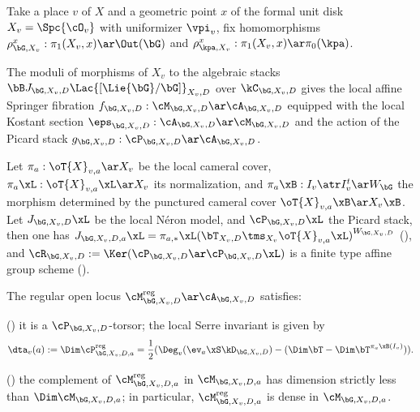 \documentclass[a4paper, twoside]{article}
\begin{document}
\begin{stp}
	Take a place $v$ of $X$ and a geometric point $x$ of the formal unit disk $X_{v}=\Spc{\cO_{v}}$ with uniformizer $\vpi_{v}$, fix homomorphisms $\rho_{\bG,X_{v}}^{x}:\pi_{1}(X_{v},x)\ar\Out(\bG)$ and $\rho_{\kpa,X_{v}}^{x}:\pi_{1}(X_{v},x)\ar\pi_{0}(\kpa)$.

	The moduli of morphisms of $X_{v}$ to the algebraic stacks $\bB J_{\bG,X_{v},D}\Lac {[\Lie{\bG}/\bG]}_{X_{v},D}$ over $\kC_{\bG,X_{v},D}$ gives the local affine Springer fibration $f_{\bG,X_{v},D}:\cM_{\bG,X_{v},D}\ar\cA_{\bG,X_{v},D}$ equipped with the local Kostant section $\eps_{\bG,X_{v},D}:\cA_{\bG,X_{v},D}\ar\cM_{\bG,X_{v},D}$ and the action of the Picard stack $g_{\bG,X_{v},D}:\cP_{\bG,X_{v},D}\ar\cA_{\bG,X_{v},D}$.

	Let $\pi_{a}:\oT{X}_{v,a}\ar X_{v}$ be the local cameral cover, $\pi_{a}\xL:\oT{X}_{v,a}\xL\ar X_{v}$ its normalization, and $\pi_{a}\xB:I_{v}\atr I_{v}^{t}\ar W_{\bG}$ the morphism determined by the punctured cameral cover $\oT{X}_{v,a}\xB\ar X_{v}\xB$. Let $J_{\bG,X_{v},D}\xL$ be the local N{\'e}ron model, and $\cP_{\bG,X_{v},D}\xL$ the Picard stack, then one has $J_{\bG,X_{v},D,a}\xL={\pi_{a,*}\xL(\bT_{X_{v},D}\tms_{X_{v}}\oT{X}_{v,a}\xL)}^{W_{\bG,X_{v},D}}$ (\cite[Proposition~3.8.2]{Ngo2010Lemme}), and $\cR_{\bG,X_{v},D}:=\Ker(\cP_{\bG,X_{v},D}\ar\cP_{\bG,X_{v},D}\xL)$ is a finite type affine group scheme (\cite[Lemma~3.8.1]{Ngo2010Lemme}).

\end{stp}

\begin{thm}
	The regular open locus $\cM_{\bG,X_{v},D}^{\text{reg}}\ar\cA_{\bG,X_{v},D}$ satisfies:
	\begin{itm}
		\item (\cite[Lemma~3.3.1, Proposition~3.7.5]{Ngo2010Lemme}) it is a $\cP_{\bG,X_{v},D}$-torsor; the local Serre invariant is given by
		\[
			\dta_{v}(a):=\Dim\cP_{\bG,X_{v},D,a}^{\text{reg}}=\frac{1}{2}(\Deg_{v}(\ev_{a}\xS\kD_{\bG,X_{v},D})-(\Dim\bT-\Dim\bT^{\pi_{a}\xB(I_{v})})).
		\]
		\item (\cite[Proposition~3.7.1, Proposition~3.10.1]{Ngo2010Lemme}) the complement of $\cM_{\bG,X_{v},D,a}^{\text{reg}}$ in $\cM_{\bG,X_{v},D,a}$ has dimension strictly less than $\Dim\cM_{\bG,X_{v},D,a}$; in particular, $\cM_{\bG,X_{v},D,a}^{\text{reg}}$ is dense in $\cM_{\bG,X_{v},D,a}$.
	\end{itm}
\end{thm}
\end{document}
